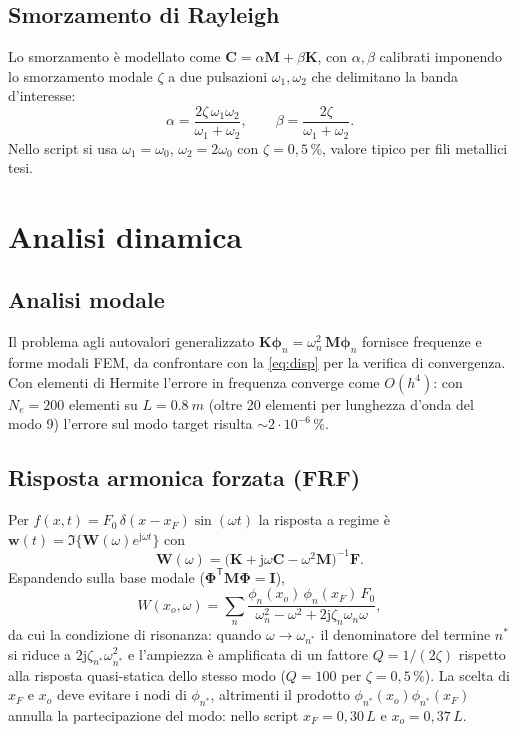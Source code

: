 \documentclass[11pt,a4paper]{article}
\begin{document}
\subsection{Smorzamento di Rayleigh}
Lo smorzamento \`e modellato come
$\bm{C} = \alpha\bm{M} + \beta\bm{K}$, con $\alpha,\beta$ calibrati imponendo
lo smorzamento modale $\zeta$ a due pulsazioni $\omega_1,\omega_2$ che
delimitano la banda d'interesse:
\begin{equation}
\alpha = \frac{2\zeta\,\omega_1\omega_2}{\omega_1+\omega_2},
\qquad
\beta = \frac{2\zeta}{\omega_1+\omega_2}.
\end{equation}
Nello script si usa $\omega_1 = \omega_0$, $\omega_2 = 2\omega_0$ con
$\zeta = 0{,}5\,\%$, valore tipico per fili metallici tesi.

\section{Analisi dinamica}
\subsection{Analisi modale}
Il problema agli autovalori generalizzato
$\bm{K}\bm{\phi}_n = \omega_n^2\,\bm{M}\bm{\phi}_n$ fornisce frequenze e forme
modali FEM, da confrontare con la \eqref{eq:disp} per la verifica di
convergenza. Con elementi di Hermite l'errore in frequenza converge come
$O(h^4)$: con $N_e = 200$ elementi su $L = \SI{0.8}{m}$ (oltre 20 elementi per
lunghezza d'onda del modo 9) l'errore sul modo target risulta
$\sim 2\cdot10^{-6}\,\%$.

\subsection{Risposta armonica forzata (FRF)}
Per $f(x,t) = F_0\,\delta(x-x_F)\sin(\omega t)$ la risposta a regime \`e
$\bm{w}(t) = \Im\{\bm{W}(\omega)e^{\mathrm{j}\omega t}\}$ con
\begin{equation}
\bm{W}(\omega) =
\bigl(\bm{K} + \mathrm{j}\omega\bm{C} - \omega^2\bm{M}\bigr)^{-1}\bm{F}.
\label{eq:frf}
\end{equation}
Espandendo sulla base modale ($\bm{\Phi}^{\mathsf T}\bm{M}\bm{\Phi}=\bm{I}$),
\begin{equation}
W(x_o,\omega) = \sum_n
\frac{\phi_n(x_o)\,\phi_n(x_F)\,F_0}
{\omega_n^2 - \omega^2 + 2\mathrm{j}\zeta_n\omega_n\omega},
\label{eq:modal}
\end{equation}
da cui la condizione di risonanza: quando $\omega \to \omega_{n^\ast}$ il
denominatore del termine $n^\ast$ si riduce a
$2\mathrm{j}\zeta_{n^\ast}\omega_{n^\ast}^2$ e l'ampiezza \`e amplificata di
un fattore $Q = 1/(2\zeta)$ rispetto alla risposta quasi-statica dello stesso
modo ($Q = 100$ per $\zeta = 0{,}5\,\%$). La scelta di $x_F$ e $x_o$ deve
evitare i nodi di $\phi_{n^\ast}$, altrimenti il prodotto
$\phi_{n^\ast}(x_o)\phi_{n^\ast}(x_F)$ annulla la partecipazione del modo:
nello script $x_F = 0{,}30\,L$ e $x_o = 0{,}37\,L$.
\end{document}
